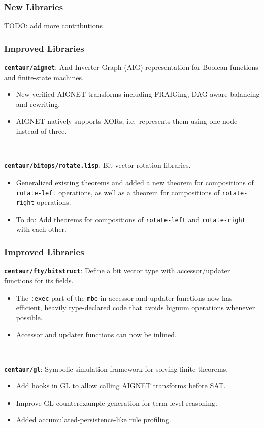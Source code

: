 \documentclass{beamer}
\newcommand{\code}[1]{\texttt{#1}}
\newcommand{\bookpath}[1]{\textbf{\code{#1}}}
\newcommand{\newlibtitle}{\frametitle{New Libraries}}
\newcommand{\implibtitle}{\frametitle{Improved Libraries}}
\begin{document}
\begin{frame}

\newlibtitle

TODO: add more contributions

\end{frame}


\begin{frame}

\implibtitle

\bookpath{centaur/aignet}:
And-Inverter Graph (AIG) representation
for Boolean functions and finite-state machines.
\begin{itemize}
\item
New verified AIGNET transforms including FRAIGing, DAG-aware balancing
and rewriting.
\item
AIGNET natively supports XORs, i.e.\ represents them using one node
instead of three.
\end{itemize}

\

\bookpath{centaur/bitops/rotate.lisp}:
Bit-vector rotation libraries.
\begin{itemize}
\item
Generalized existing theorems and added a new theorem for compositions
of \code{rotate-left} operations, as well as a theorem for
compositions of \code{rotate-right} operations.
\item
To do: Add theorems for compositions of \code{rotate-left} and
\code{rotate-right} with each other.
\end{itemize}

\end{frame}


\begin{frame}

\implibtitle

\bookpath{centaur/fty/bitstruct}:
Define a bit vector type with accessor/updater functions for its fields.
\begin{itemize}
\item
The \code{:exec} part of the \code{mbe} in accessor and updater
functions now has efficient, heavily type-declared code that avoids
bignum operations whenever possible.
\item
Accessor and updater functions can now be inlined.
\end{itemize}

\

\bookpath{centaur/gl}:
Symbolic simulation framework for solving finite theorems.
\begin{itemize}
\item
Add hooks in GL to allow calling AIGNET transforms before SAT.
\item
Improve GL counterexample generation for term-level reasoning.
\item
Added accumulated-persistence-like rule profiling.
\end{itemize}

\end{frame}
\end{document}
